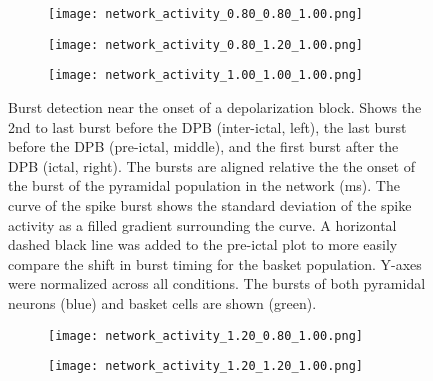 \begin{figure}[!htb]
    \centering
    \begin{subfigure}{\textwidth}
        \texttt{[image: network\_activity\_0.80\_0.80\_1.00.png]}
        \caption{} %
    \end{subfigure}
    \vspace{1em} %

    \begin{subfigure}{\textwidth}
        \texttt{[image: network\_activity\_0.80\_1.20\_1.00.png]}
        \caption{} %
    \end{subfigure}
    \vspace{1em} %

    \begin{subfigure}{\textwidth}
        \texttt{[image: network\_activity\_1.00\_1.00\_1.00.png]}
        \caption{} %
    \end{subfigure}

    \caption[Burst detection near the onset of a depolarization block]{Burst detection near the onset of a depolarization block. Shows the 2nd to last burst before the DPB (inter-ictal, left), 
    the last burst before the DPB (pre-ictal, middle), and the first burst after the DPB (ictal, right). 
    The bursts are aligned relative the the onset of the burst of the pyramidal population in the network (ms). 
    The curve of the spike burst shows the standard deviation of the spike activity as a filled gradient surrounding the curve.
    A horizontal dashed black line was added to the pre-ictal plot to more easily compare the shift in burst timing for the basket population.
    Y-axes were normalized across all conditions.
    The bursts of both pyramidal neurons (blue) and basket cells are shown (green).}\label{fig:burst_detection}
\end{figure}
\clearpage %

\begin{figure}[!htb] \ContinuedFloat%
    \centering
    \begin{subfigure}{\textwidth}
        \texttt{[image: network\_activity\_1.20\_0.80\_1.00.png]}
        \caption{} %
    \end{subfigure}
    \vspace{1em} %

    \begin{subfigure}{\textwidth}
        \texttt{[image: network\_activity\_1.20\_1.20\_1.00.png]}
        \caption{} %
    \end{subfigure}

\end{figure}
\pagebreak

